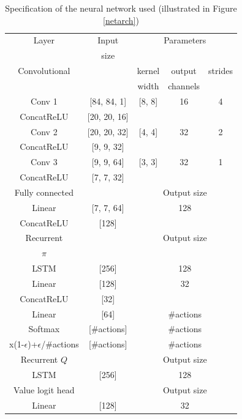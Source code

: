 \documentclass{article}
\begin{document}
\begin{table}[ht]
\caption{Specification of the neural network used (illustrated in Figure 
\ref{netarch})}
\label{specs-table}
\vskip 0.1in
\begin{center}
\begin{sc}
\begin{tabular}{| c | c | c | c | c |}
\hline
Layer & Input & \multicolumn{3}{|c|}{ Parameters} \\
      & size  & \multicolumn{3}{|c|}{ } \\
\hline
Convolutional & & kernel & output & strides\\
              & & width & channels & \\
\hline
Conv 1 & [84, 84, 1] & [8, 8] & 16 & 4 \\
ConcatReLU & [20, 20, 16] & & & \\
Conv 2 & [20, 20, 32] & [4, 4] & 32 & 2 \\
ConcatReLU & [9, 9, 32] & & & \\
Conv 3 & [9, 9, 64] & [3, 3] & 32 & 1 \\
ConcatReLU & [7, 7, 32] & & & \\
\hline
Fully connected & & \multicolumn{3}{|c|}{ Output size} \\
\hline
Linear & [7, 7, 64] & \multicolumn{3}{|c|}{ 128 }\\
ConcatReLU & [128] & \multicolumn{3}{|c|}{} \\
\hline
Recurrent & & \multicolumn{3}{|c|}{ Output size} \\
$\pi$ & & \multicolumn{3}{|c|}{ } \\
\hline
LSTM & [256] & \multicolumn{3}{|c|}{ 128 }\\
Linear & [128] & \multicolumn{3}{|c|}{ 32 }\\
ConcatReLU & [32] & \multicolumn{3}{|c|}{ }\\
Linear & [64] & \multicolumn{3}{|c|}{ \#actions }\\
Softmax & [\#actions] & \multicolumn{3}{|c|}{ \#actions }\\
x(1-$\epsilon$)+$\epsilon$/\#actions & [\#actions] & \multicolumn{3}{|c|}{ 
\#actions }\\
\hline
Recurrent $Q$ & & \multicolumn{3}{|c|}{ Output size} \\
\hline
LSTM & [256] & \multicolumn{3}{|c|}{ 128 }\\
\hline
Value logit head & & \multicolumn{3}{|c|}{  Output size} \\
\hline
Linear & [128] & \multicolumn{3}{|c|}{ 32 }\\

\end{tabular}
\end{sc}
\end{center}
\end{table}
\end{document}
